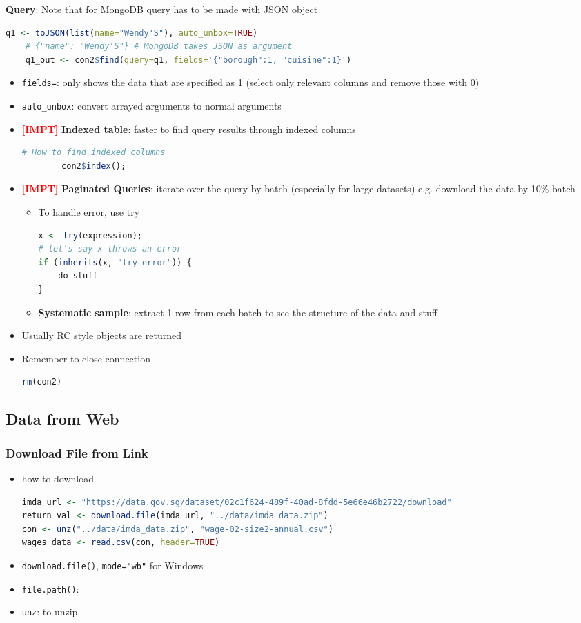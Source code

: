 \documentclass{article}
\newcommand{\impt}[0]{\textcolor{red}{\textbf{[IMPT] }}}
\begin{document}
\begin{multicols}{2}
\textbf{Query}: Note that for MongoDB query has to be made with JSON object
\begin{lstlisting}[language=R]
	q1 <- toJSON(list(name="Wendy'S"), auto_unbox=TRUE)
	# {"name": "Wendy'S"} # MongoDB takes JSON as argument
	q1_out <- con2$find(query=q1, fields='{"borough":1, "cuisine":1}')
\end{lstlisting}
\begin{itemize}
	\item \texttt{fields=}: only shows the data that are specified as 1 (select only relevant columns and remove those with 0)
	\item \texttt{auto\_unbox}: convert arrayed arguments to normal arguments
	\item \impt \textbf{Indexed table}: faster to find query results through indexed columns
	\begin{lstlisting}[language=R]
		# How to find indexed columns
		con2$index();\end{lstlisting}
	\item \impt \textbf{Paginated Queries}: iterate over the query by batch (especially for large datasets) e.g. download the data by 10\% batch
	\begin{itemize}
		\item To handle error, use try
		\begin{lstlisting}[language=R]
x <- try(expression);
# let's say x throws an error
if (inherits(x, "try-error")) {
	do stuff
}\end{lstlisting}
        \item \textbf{Systematic sample}: extract 1 row from each batch to see the structure of the data and stuff
	\end{itemize}
    \item Usually RC style objects are returned
    \item Remember to close connection
    \begin{lstlisting}[language=R]
rm(con2)\end{lstlisting}
\end{itemize}
\subsection{Data from Web}

\subsubsection{Download File from Link}
\begin{itemize}
	\item how to download
	\begin{lstlisting}[language=R]
imda_url <- "https://data.gov.sg/dataset/02c1f624-489f-40ad-8fdd-5e66e46b2722/download"
return_val <- download.file(imda_url, "../data/imda_data.zip")
con <- unz("../data/imda_data.zip", "wage-02-size2-annual.csv")
wages_data <- read.csv(con, header=TRUE)\end{lstlisting}
	\item \texttt{download.file()}, \texttt{mode="wb"} for Windows
	\item \texttt{file.path()}:
	\item \texttt{unz}: to unzip
\end{itemize}

\end{multicols}
\end{document}
